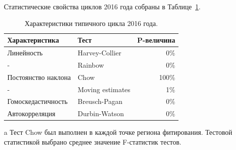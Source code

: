 \documentclass{article}
\begin{document}
	Статистические свойства циклов 2016 года собраны в Таблице~\ref{tbl:CycleChars}.
	
	\begin{center}
		\begin{table}
			\centering
			\begin{threeparttable}
				\caption{Характеристики типичного цикла 2016 года.\label{tbl:CycleChars}}
				\begin{tabular}{llr}
					\hline\hline
					Характеристика      & Тест             & P-величина \\ \hline
					Линейность          & Harvey-Collier   &        0\% \\
					-                   & Rainbow          &        0\% \\
					Постоянство наклона & Chow\tnote{a}    &      100\% \\
					-                   & Moving estimates &        1\% \\
					Гомоскедастичность  & Breusch-Pagan    &        0\% \\
					Автокорреляция      & Durbin-Watson    &        0\% \\ \hline\hline
				\end{tabular}
				\begin{tablenotes}
					\item[a]{Тест Chow был выполнен в каждой точке региона фитирования. Тестовой статистикой выбрано среднее значение F-статистик тестов.}
				\end{tablenotes}
			\end{threeparttable}
		\end{table}
	\end{center}
\end{document}
